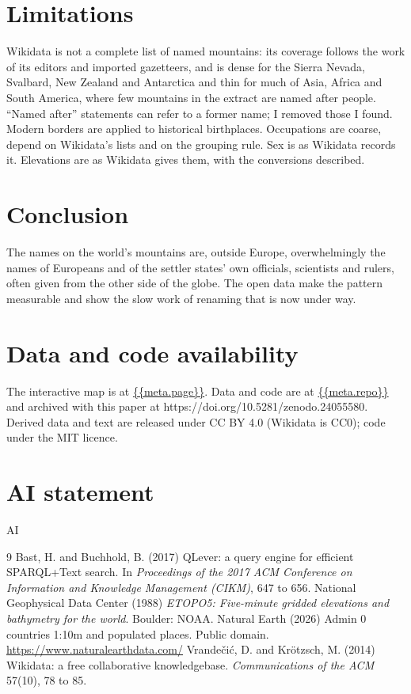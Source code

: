 \documentclass[11pt,a4paper]{article}
\begin{document}
\section{Limitations}
Wikidata is not a complete list of named mountains: its coverage follows the work of its editors and imported gazetteers, and is dense for the Sierra Nevada, Svalbard, New Zealand and Antarctica and thin for much of Asia, Africa and South America, where few mountains in the extract are named after people. ``Named after'' statements can refer to a former name; I removed those I found. Modern borders are applied to historical birthplaces. Occupations are coarse, depend on Wikidata's lists and on the grouping rule. Sex is as Wikidata records it. Elevations are as Wikidata gives them, with the conversions described.

\section{Conclusion}
The names on the world's mountains are, outside Europe, overwhelmingly the names of Europeans and of the settler states' own officials, scientists and rulers, often given from the other side of the globe. The open data make the pattern measurable and show the slow work of renaming that is now under way.

\section*{Data and code availability}
The interactive map is at \url{{{meta.page}}}. Data and code are at \url{{{meta.repo}}} and archived with this paper at https://doi.org/10.5281/zenodo.24055580. Derived data and text are released under CC BY 4.0 (Wikidata is CC0); code under the MIT licence.

\section*{AI statement}
{{AI}}

\begin{thebibliography}{9}
 Bast, H. and Buchhold, B. (2017) QLever: a query engine for efficient SPARQL+Text search. In \textit{Proceedings of the 2017 ACM Conference on Information and Knowledge Management (CIKM)}, 647 to 656.
 National Geophysical Data Center (1988) \textit{ETOPO5: Five-minute gridded elevations and bathymetry for the world}. Boulder: NOAA.
 Natural Earth (2026) Admin 0 countries 1:10m and populated places. Public domain. \url{https://www.naturalearthdata.com/}
 Vrande\v{c}i\'c, D. and Kr\"otzsch, M. (2014) Wikidata: a free collaborative knowledgebase. \textit{Communications of the ACM} 57(10), 78 to 85.
\end{thebibliography}
\end{document}
